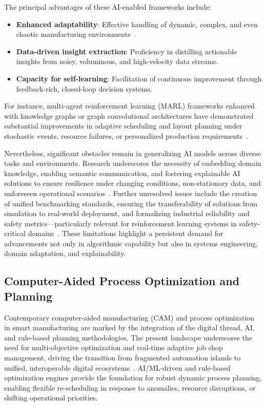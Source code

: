 \documentclass[sigconf]{acmart}
\begin{document}
The principal advantages of these AI-enabled frameworks include:

\begin{itemize}
    \item \textbf{Enhanced adaptability}: Effective handling of dynamic, complex, and even chaotic manufacturing environments~\cite{ref13,ref19}.
    \item \textbf{Data-driven insight extraction}: Proficiency in distilling actionable insights from noisy, voluminous, and high-velocity data streams.
    \item \textbf{Capacity for self-learning}: Facilitation of continuous improvement through feedback-rich, closed-loop decision systems.
\end{itemize}

For instance, multi-agent reinforcement learning (MARL) frameworks enhanced with knowledge graphs or graph convolutional architectures have demonstrated substantial improvements in adaptive scheduling and layout planning under stochastic events, resource failures, or personalized production requirements~\cite{ref27,ref37}.

Nevertheless, significant obstacles remain in generalizing AI models across diverse tasks and environments. Research underscores the necessity of embedding domain knowledge, enabling semantic communication, and fostering explainable AI solutions to ensure resilience under changing conditions, non-stationary data, and unforeseen operational scenarios~\cite{ref37,ref41}. Further unresolved issues include the creation of unified benchmarking standards, ensuring the transferability of solutions from simulation to real-world deployment, and formalizing industrial reliability and safety metrics—particularly relevant for reinforcement learning systems in safety-critical domains~\cite{ref38}. These limitations highlight a persistent demand for advancements not only in algorithmic capability but also in systems engineering, domain adaptation, and explainability.

\subsection{Computer-Aided Process Optimization and Planning}

Contemporary computer-aided manufacturing (CAM) and process optimization in smart manufacturing are marked by the integration of the digital thread, AI, and rule-based planning methodologies. The present landscape underscores the need for multi-objective optimization and real-time adaptive job shop management, driving the transition from fragmented automation islands to unified, interoperable digital ecosystems~\cite{ref4,ref11,ref16,ref18,ref19,ref20,ref27,ref28,ref29,ref30,ref38,ref44,ref45,ref49,ref51,ref55,ref59,ref60,ref61,ref70}. AI/ML-driven and rule-based optimization engines provide the foundation for robust dynamic process planning, enabling flexible re-scheduling in response to anomalies, resource disruptions, or shifting operational priorities.
\end{document}
